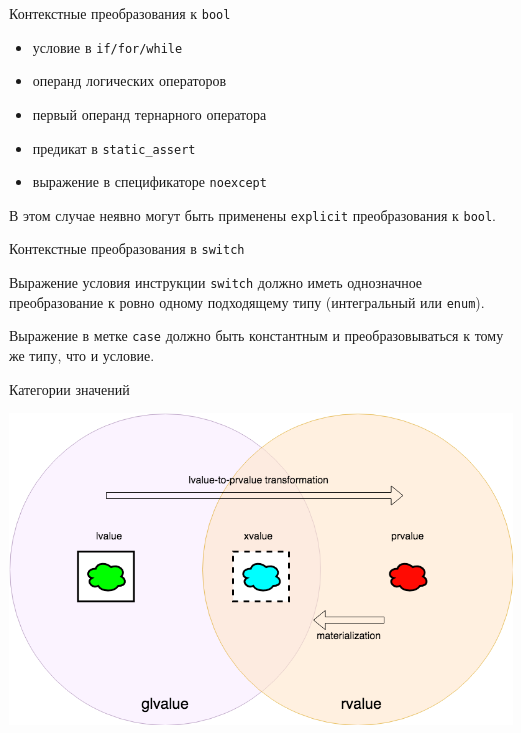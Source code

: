 \documentclass[unknownkeysallowed,xcolor=table]{beamer}
\begin{document}
\begin{frame}{Контекстные преобразования к \lstinline{bool}}

\begin{itemize}
  \item условие в \lstinline{if/for/while} \vspace{0.5em}
  \item операнд логических операторов \vspace{0.5em}
  \item первый операнд тернарного оператора \vspace{0.5em}
  \item предикат в \lstinline{static_assert} \vspace{0.5em}
  \item выражение в спецификаторе \lstinline{noexcept} \vspace{0.5em}
\end{itemize}
\vspace{1.5em}
В этом случае неявно могут быть применены \lstinline{explicit} преобразования к \lstinline{bool}.

\end{frame}

\begin{frame}{Контекстные преобразования в \lstinline{switch}}

Выражение условия инструкции \lstinline{switch} должно иметь однозначное преобразование к ровно одному подходящему типу (интегральный или \lstinline{enum}).
\vspace{1.5em}

Выражение в метке \lstinline{case} должно быть константным и преобразовываться к тому же типу, что и условие.

\end{frame}

\begin{frame}{Категории значений}

\includegraphics[width = \textwidth,align=c,keepaspectratio]{pictures/value_categories.png}

\end{frame}
\end{document}
